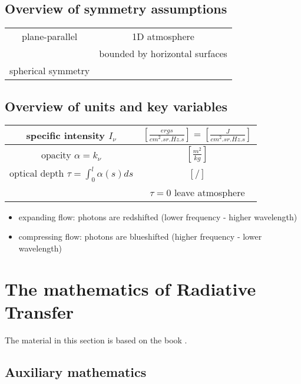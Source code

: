 \documentclass[../main/main.tex]{subfiles}
\begin{document}
\subsection{Overview of symmetry assumptions}
\begin{center}
\centering
{\tabulinesep=1.5mm
\begin{tabu}{|c|c|}
\hline 
plane-parallel & 1D atmosphere \\ 
& bounded by horizontal surfaces \\ \hline

spherical symmetry & \\ \hline
\end{tabu}}
\end{center}


\subsection{Overview of units and key variables}
\begin{center}
\centering
{\tabulinesep=1.5mm
\begin{tabu}{|c|c|}
\hline 
specific intensity $I_{\nu}$ & $\left[ \frac{ergs}{cm^2 . sr . Hz . s} \right] = \left[ \frac{J}{cm^2 . sr . Hz . s} \right] $ \\ \hline

opacity $\alpha = k_{\nu}$ & $\left[ \frac{m^2}{kg} \right] $ \\ \hline

optical depth $\tau = \int_0^l \alpha(s) ds$ & $[/]$ \\ 
& $\boxed{\tau = 0}$ leave atmosphere \\ \hline
\end{tabu}}
\end{center}

\begin{itemize}
\item expanding flow: photons are redshifted (lower frequency - higher wavelength)
\item compressing flow: photons are blueshifted (higher frequency - lower wavelength)
\end{itemize}


\newpage
\section{The mathematics of Radiative Transfer}
The material in this section is based on the book \cite{Busbridge}.

\subsection{Auxiliary mathematics}
\end{document}
